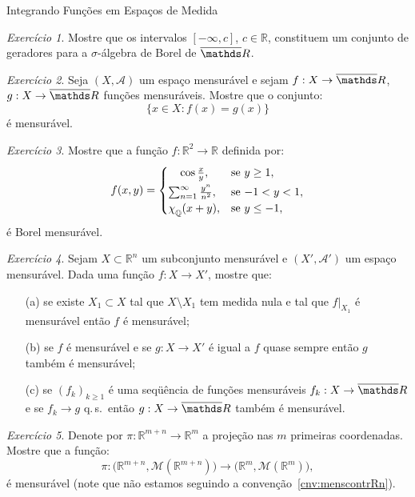 \documentclass[oneside,final,11pt]{amsbook}
\newcommand{\R}{\mathds R}
\newcommand{\qs}{\hbox{q.$\,$s.}}
\newcommand{\chilow}[1]{\chi_{\lower2pt\hbox{$\scriptstyle#1$}}}
\newcommand{\Lebmens}{\mathcal M}
\theoremstyle{remark}\newtheorem{exercise}{Exercício}[chapter]
\theoremstyle{remark}\newtheorem{*exercise}[exercise]{\hbox to 0pt{\hskip 0pt minus 1fil*}Exercício}
\theoremstyle{definition}\newtheorem{exdefin}{Definição}[chapter]
\theoremstyle{plain}\newtheorem{teo}{Teorema}[section]
\theoremstyle{plain}\newtheorem{lem}[teo]{Lema}
\theoremstyle{plain}\newtheorem{prop}[teo]{Proposição}
\theoremstyle{plain}\newtheorem{cor}[teo]{Corolário}
\theoremstyle{definition}\newtheorem{defin}[teo]{Definição}
\theoremstyle{remark}\newtheorem{rem}[teo]{Observação}
\theoremstyle{definition}\newtheorem{notation}[teo]{Notação}
\theoremstyle{definition}\newtheorem{convention}[teo]{Convenção}
\theoremstyle{definition}\newtheorem{example}[teo]{Exemplo}
\numberwithin{section}{chapter}
\numberwithin{equation}{section}
\begin{document}
\begin{chapter}{Integrando Funções em Espaços de Medida}
\begin{exercise}\label{exe:geradoresbarR}
Mostre que os intervalos $[-\infty,c]$, $c\in\R$, constituem um conjunto de geradores
para a $\sigma$-álgebra de Borel de $\overline\R$.
\end{exercise}

\begin{exercise}\label{exe:figualg}
Seja $(X,\mathcal A)$ um espaço mensurável e sejam $f:X\to\overline\R$, $g:X\to\overline\R$
funções mensuráveis. Mostre que o conjunto:
\[\big\{x\in X:f(x)=g(x)\big\}\]
é mensurável.
\end{exercise}

\begin{exercise}\label{exe:funcaomaluca}
Mostre que a função $f:\R^2\to\R$ definida por:
\[f(x,y)=\begin{cases}
\hfil\cos\frac xy,&\text{se $y\ge1$},\\[3pt]
\sum_{n=1}^\infty\frac{y^n}{n^2},&\text{se $-1<y<1$},\\
\chilow{\mathbb Q}(x+y),&\text{se $y\le-1$},
\end{cases}\]
é Borel mensurável.
\end{exercise}

\begin{exercise}\label{exe:mensqs}
Sejam $X\subset\R^n$ um subconjunto mensurável e $(X',\mathcal A')$ um espaço mensurável.
Dada uma função $f:X\to X'$, mostre que:
\begin{itemize}
\item[(a)] se existe $X_1\subset X$ tal que $X\setminus X_1$ tem medida nula e
tal que $f\vert_{X_1}$ é mensurável então $f$ é mensurável;
\item[(b)] se $f$ é mensurável e se $g:X\to X'$ é igual a $f$ quase sempre então $g$
também é mensurável;
\item[(c)] se $(f_k)_{k\ge1}$ é uma seqüência de funções mensuráveis $f_k:X\to\overline\R$
e se $f_k\to g$ \qs\ então $g:X\to\overline\R$ também é mensurável.
\end{itemize}
\end{exercise}

\begin{exercise}\label{thm:projLebmens}
Denote por $\pi:\R^{m+n}\to\R^m$ a projeção nas $m$ primeiras coordenadas. Mostre que
a função:
\[\pi:\big(\R^{m+n},\Lebmens(\R^{m+n})\big)\longrightarrow\big(\R^m,\Lebmens(\R^m)\big),\]
é mensurável (note que não estamos seguindo a convenção~\ref{cnv:menscontrRn}).
\end{exercise}


\end{chapter}
\end{document}
